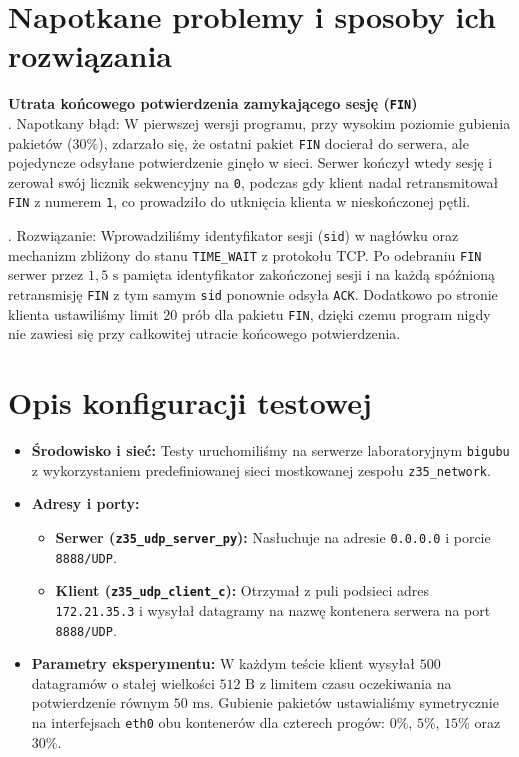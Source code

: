 \documentclass[12pt,a4paper]{article}
\begin{document}
\section*{Napotkane problemy i sposoby ich rozwiązania}

\textbf{Utrata końcowego potwierdzenia zamykającego sesję (\texttt{FIN})} \\
. Napotkany błąd: W pierwszej wersji programu, przy wysokim poziomie gubienia pakietów ($30\%$), zdarzało się, że ostatni pakiet \texttt{FIN} docierał do serwera, ale pojedyncze odsyłane potwierdzenie ginęło w sieci. Serwer kończył wtedy sesję i zerował swój licznik sekwencyjny na \texttt{0}, podczas gdy klient nadal retransmitował \texttt{FIN} z numerem \texttt{1}, co prowadziło do utknięcia klienta w nieskończonej pętli.

. Rozwiązanie: Wprowadziliśmy identyfikator sesji (\texttt{sid}) w nagłówku oraz mechanizm zbliżony do stanu \texttt{TIME\_WAIT} z protokołu TCP. Po odebraniu \texttt{FIN} serwer przez $1{,}5\text{ s}$ pamięta identyfikator zakończonej sesji i na każdą spóźnioną retransmisję \texttt{FIN} z tym samym \texttt{sid} ponownie odsyła \texttt{ACK}. Dodatkowo po stronie klienta ustawiliśmy limit $20$ prób dla pakietu \texttt{FIN}, dzięki czemu program nigdy nie zawiesi się przy całkowitej utracie końcowego potwierdzenia.


\section*{Opis konfiguracji testowej}

\begin{itemize}
    \item \textbf{Środowisko i sieć:} Testy uruchomiliśmy na serwerze laboratoryjnym \texttt{bigubu} z wykorzystaniem predefiniowanej sieci mostkowanej zespołu \texttt{z35\_network}.
    \item \textbf{Adresy i porty:}
    \begin{itemize}
        \item \textbf{Serwer (\texttt{z35\_udp\_server\_py}):} Nasłuchuje na adresie \texttt{0.0.0.0} i porcie \texttt{8888/UDP}.
        \item \textbf{Klient (\texttt{z35\_udp\_client\_c}):} Otrzymał z puli podsieci adres \texttt{172.21.35.3} i wysyłał datagramy na nazwę kontenera serwera na port \texttt{8888/UDP}.
    \end{itemize}
    \item \textbf{Parametry eksperymentu:} W każdym teście klient wysyłał $500$ datagramów o stałej wielkości $512\text{ B}$ z limitem czasu oczekiwania na potwierdzenie równym $50\text{ ms}$. Gubienie pakietów ustawialiśmy symetrycznie na interfejsach \texttt{eth0} obu kontenerów dla czterech progów: $0\%$, $5\%$, $15\%$ oraz $30\%$.
\end{itemize}
\end{document}

